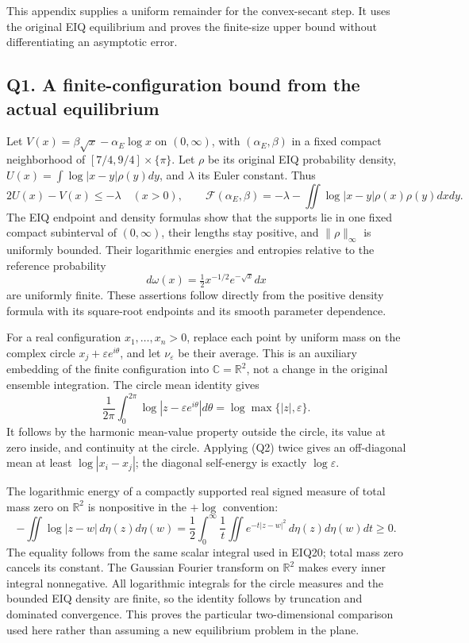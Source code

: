 \documentclass[11pt,a4paper]{article}
\begin{document}
This appendix supplies a uniform remainder for the convex-secant step.
It uses the original EIQ equilibrium and proves the finite-size upper
bound without differentiating an asymptotic error.

\subsection{Q1. A finite-configuration bound from the actual
equilibrium}\label{sa:q1.-a-finite-configuration-bound-from-the-actual-equilibrium}

Let \(V(x)=\beta\sqrt x-\alpha_E\log x\) on \((0,\infty)\), with
\((\alpha_E,\beta)\) in a fixed compact neighborhood of
\([7/4,9/4]\times\{\pi\}\). Let \(\rho\) be its original EIQ probability
density, \(U(x)=\int\log|x-y|\rho(y)dy\), and \(\lambda\) its Euler
constant. Thus \[
2U(x)-V(x)\le-\lambda\quad(x>0),\qquad
\mathcal F(\alpha_E,\beta)=-\lambda-\iint\log|x-y|\rho(x)\rho(y)dxdy.
\tag{Q1}
\] The EIQ endpoint and density formulas show that the supports lie in
one fixed compact subinterval of \((0,\infty)\), their lengths stay
positive, and \(\|\rho\|_\infty\) is uniformly bounded. Their
logarithmic energies and entropies relative to the reference probability
\[
d\omega(x)=\tfrac12x^{-1/2}e^{-\sqrt x}dx
\] are uniformly finite. These assertions follow directly from the
positive density formula with its square-root endpoints and its smooth
parameter dependence.

For a real configuration \(x_1,\ldots,x_n>0\), replace each point by
uniform mass on the complex circle \(x_j+\varepsilon e^{i\theta}\), and
let \(\nu_\varepsilon\) be their average. This is an auxiliary embedding
of the finite configuration into \(\mathbb C=\mathbb R^2\), not a change
in the original ensemble integration. The circle mean identity gives \[
\frac1{2\pi}\int_0^{2\pi}\log|z-\varepsilon e^{i\theta}|d\theta
=\log\max\{|z|,\varepsilon\}.
\tag{Q2}
\] It follows by the harmonic mean-value property outside the circle,
its value at zero inside, and continuity at the circle. Applying (Q2)
twice gives an off-diagonal mean at least \(\log|x_i-x_j|\); the
diagonal self-energy is exactly \(\log\varepsilon\).

The logarithmic energy of a compactly supported real signed measure of
total mass zero on \(\mathbb R^2\) is nonpositive in the \(+\log\)
convention: \[
-\iint\log|z-w|\,d\eta(z)d\eta(w)
=\frac12\int_0^\infty\frac1t\iint e^{-t|z-w|^2}\,d\eta(z)d\eta(w)dt\ge0.
\tag{Q3}
\] The equality follows from the same scalar integral used in EIQ20;
total mass zero cancels its constant. The Gaussian Fourier transform on
\(\mathbb R^2\) makes every inner integral nonnegative. All logarithmic
integrals for the circle measures and the bounded EIQ density are
finite, so the identity follows by truncation and dominated convergence.
This proves the particular two-dimensional comparison used here rather
than assuming a new equilibrium problem in the plane.
\end{document}
